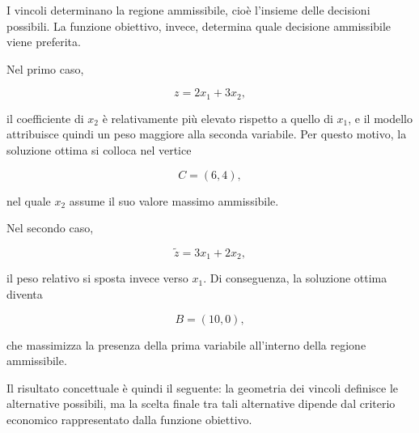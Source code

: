 \begin{enumerate}
I vincoli determinano la regione ammissibile, cio\`e l'insieme delle decisioni
possibili. La funzione obiettivo, invece, determina quale decisione ammissibile
viene preferita.

Nel primo caso,

\[
z=2x_1+3x_2,
\]

il coefficiente di \(x_2\) \`e relativamente pi\`u elevato rispetto a quello
di \(x_1\), e il modello attribuisce quindi un peso maggiore alla seconda
variabile. Per questo motivo, la soluzione ottima si colloca nel vertice

\[
C=(6,4),
\]

nel quale \(x_2\) assume il suo valore massimo ammissibile.

Nel secondo caso,

\[
\widetilde z=3x_1+2x_2,
\]

il peso relativo si sposta invece verso \(x_1\). Di conseguenza, la soluzione
ottima diventa

\[
B=(10,0),
\]

che massimizza la presenza della prima variabile all'interno della regione
ammissibile.

Il risultato concettuale \`e quindi il seguente: la geometria dei vincoli definisce
le alternative possibili, ma la scelta finale tra tali alternative dipende dal
criterio economico rappresentato dalla funzione obiettivo.

\end{enumerate}

